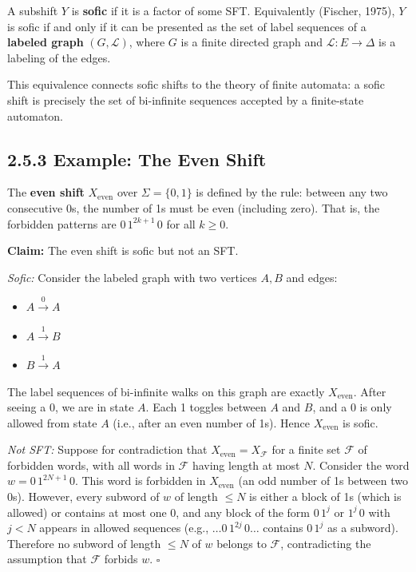 \begin{definition}
A subshift $Y$ is \textbf{sofic} if it is a factor of some SFT. Equivalently (Fischer, 1975), $Y$ is sofic if and only if it can be presented as the set of label sequences of a \textbf{labeled graph} $(G, \mathcal{L})$, where $G$ is a finite directed graph and $\mathcal{L} : E \to \Delta$ is a labeling of the edges.

This equivalence connects sofic shifts to the theory of finite automata: a sofic shift is precisely the set of bi-infinite sequences accepted by a finite-state automaton.
\end{definition}

\subsection{2.5.3 Example: The Even Shift}

\begin{example}
The \textbf{even shift} $X_{\text{even}}$ over $\Sigma = \{ 0, 1\} $ is defined by the rule: between any two consecutive 0s, the number of 1s must be even (including zero). That is, the forbidden patterns are $0 \, 1^{2k+1} \, 0$ for all $k \geq 0$.

\textbf{Claim:} The even shift is sofic but not an SFT.

\textit{Sofic:} Consider the labeled graph with two vertices $A, B$ and edges:
\end{example}

\begin{itemize}
  \item $A \xrightarrow{0} A$
  \item $A \xrightarrow{1} B$
  \item $B \xrightarrow{1} A$
\end{itemize}

The label sequences of bi-infinite walks on this graph are exactly $X_{\text{even}}$. After seeing a 0, we are in state $A$. Each 1 toggles between $A$ and $B$, and a 0 is only allowed from state $A$ (i.e., after an even number of 1s). Hence $X_{\text{even}}$ is sofic.

\textit{Not SFT:} Suppose for contradiction that $X_{\text{even}} = X_{\mathcal{F}}$ for a finite set $\mathcal{F}$ of forbidden words, with all words in $\mathcal{F}$ having length at most $N$. Consider the word $w = 0\,1^{2N+1}\,0$. This word is forbidden in $X_{\text{even}}$ (an odd number of 1s between two 0s). However, every subword of $w$ of length $\leq N$ is either a block of 1s (which is allowed) or contains at most one 0, and any block of the form $0\,1^j$ or $1^j\,0$ with $j < N$ appears in allowed sequences (e.g., $\ldots 0\,1^{2j}\,0 \ldots$ contains $0\,1^j$ as a subword). Therefore no subword of length $\leq N$ of $w$ belongs to $\mathcal{F}$, contradicting the assumption that $\mathcal{F}$ forbids $w$. $\square$

